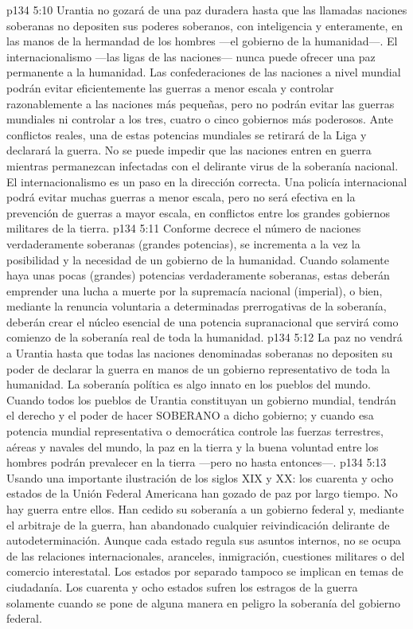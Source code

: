 \vs p134 5:10 Urantia no gozará de una paz duradera hasta que las llamadas naciones soberanas no depositen sus poderes soberanos, con inteligencia y enteramente, en las manos de la hermandad de los hombres ---el gobierno de la humanidad---. El internacionalismo ---las ligas de las naciones--- nunca puede ofrecer una paz permanente a la humanidad. Las confederaciones de las naciones a nivel mundial podrán evitar eficientemente las guerras a menor escala y controlar razonablemente a las naciones más pequeñas, pero no podrán evitar las guerras mundiales ni controlar a los tres, cuatro o cinco gobiernos más poderosos. Ante conflictos reales, una de estas potencias mundiales se retirará de la Liga y declarará la guerra. No se puede impedir que las naciones entren en guerra mientras permanezcan infectadas con el delirante virus de la soberanía nacional. El internacionalismo es un paso en la dirección correcta. Una policía internacional podrá evitar muchas guerras a menor escala, pero no será efectiva en la prevención de guerras a mayor escala, en conflictos entre los grandes gobiernos militares de la tierra.
\vs p134 5:11 Conforme decrece el número de naciones verdaderamente soberanas (grandes potencias), se incrementa a la vez la posibilidad y la necesidad de un gobierno de la humanidad. Cuando solamente haya unas pocas (grandes) potencias verdaderamente soberanas, estas deberán emprender una lucha a muerte por la supremacía nacional (imperial), o bien, mediante la renuncia voluntaria a determinadas prerrogativas de la soberanía, deberán crear el núcleo esencial de una potencia supranacional que servirá como comienzo de la soberanía real de toda la humanidad.
\vs p134 5:12 \pc La paz no vendrá a Urantia hasta que todas las naciones denominadas soberanas no depositen su poder de declarar la guerra en manos de un gobierno representativo de toda la humanidad. La soberanía política es algo innato en los pueblos del mundo. Cuando todos los pueblos de Urantia constituyan un gobierno mundial, tendrán el derecho y el poder de hacer SOBERANO a dicho gobierno; y cuando esa potencia mundial representativa o democrática controle las fuerzas terrestres, aéreas y navales del mundo, la paz en la tierra y la buena voluntad entre los hombres podrán prevalecer en la tierra ---pero no hasta entonces---.
\vs p134 5:13 Usando una importante ilustración de los siglos XIX y XX: los cuarenta y ocho estados de la Unión Federal Americana han gozado de paz por largo tiempo. No hay guerra entre ellos. Han cedido su soberanía a un gobierno federal y, mediante el arbitraje de la guerra, han abandonado cualquier reivindicación delirante de autodeterminación. Aunque cada estado regula sus asuntos internos, no se ocupa de las relaciones internacionales, aranceles, inmigración, cuestiones militares o del comercio interestatal. Los estados por separado tampoco se implican en temas de ciudadanía. Los cuarenta y ocho estados sufren los estragos de la guerra solamente cuando se pone de alguna manera en peligro la soberanía del gobierno federal.
